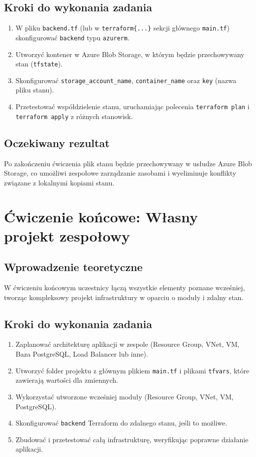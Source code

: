 \documentclass{article}
\begin{document}
\subsection{Kroki do wykonania zadania}
\begin{enumerate}
    \item W pliku \texttt{backend.tf} (lub w \texttt{terraform\{...\}} sekcji głównego \texttt{main.tf}) skonfigurować \texttt{backend} typu \texttt{azurerm}.
    \item Utworzyć kontener w Azure Blob Storage, w którym będzie przechowywany stan (\texttt{tfstate}).
    \item Skonfigurować \texttt{storage\_account\_name}, \texttt{container\_name} oraz \texttt{key} (nazwa pliku stanu).
    \item Przetestować współdzielenie stanu, uruchamiając polecenia \texttt{terraform plan} i \texttt{terraform apply} z różnych stanowisk.
\end{enumerate}

\subsection{Oczekiwany rezultat}
Po zakończeniu ćwiczenia plik stanu będzie przechowywany w usłudze Azure Blob Storage, co umożliwi zespołowe zarządzanie zasobami i wyeliminuje konflikty związane z lokalnymi kopiami stanu.

\section{Ćwiczenie końcowe: Własny projekt zespołowy}

\subsection{Wprowadzenie teoretyczne}
W ćwiczeniu końcowym uczestnicy łączą wszystkie elementy poznane wcześniej, tworząc kompleksowy projekt infrastruktury w oparciu o moduły i zdalny stan. 

\subsection{Kroki do wykonania zadania}
\begin{enumerate}
    \item Zaplanować architekturę aplikacji w zespole (Resource Group, VNet, VM, Baza PostgreSQL, Load Balancer lub inne).
    \item Utworzyć folder projektu z głównym plikiem \texttt{main.tf} i plikami \texttt{tfvars}, które zawierają wartości dla zmiennych.
    \item Wykorzystać utworzone wcześniej moduły (Resource Group, VNet, VM, PostgreSQL).
    \item Skonfigurować \texttt{backend} Terraform do zdalnego stanu, jeśli to możliwe.
    \item Zbudować i przetestować całą infrastrukturę, weryfikując poprawne działanie aplikacji.
\end{enumerate}
\end{document}

